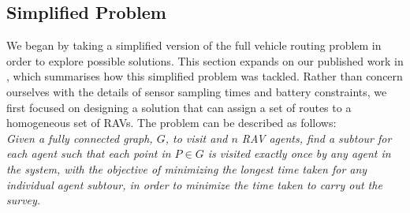 \subsection{Simplified Problem}
We began by taking a simplified version of the full vehicle routing problem in order to explore possible solutions. This section expands on our published work in \cite{Smyth2018UsingDrones}, which summarises how this simplified problem was tackled. Rather than concern ourselves with the details of sensor sampling times and battery constraints, we first focused on designing a solution that can assign a set of routes to a homogeneous set of RAVs. 
The problem can be described as follows:
\\
\textit{Given a fully connected graph, $G$, to visit and $n$ RAV agents, find a subtour for each agent such that each point in $P \in G$ is visited exactly once by any agent in the system, with the objective of minimizing the longest time taken for any individual agent subtour, in order to minimize the time taken to carry out the survey.}
\\


